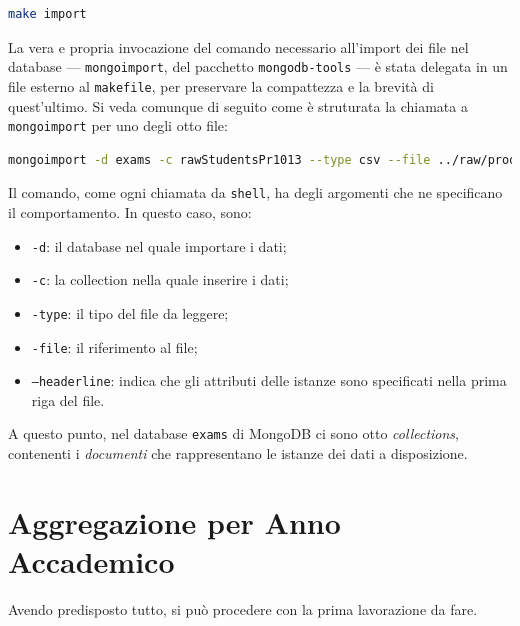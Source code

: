 	\begin{lstlisting}[language=bash,caption={importazione dei dati in MongoDB}]
		make import
	\end{lstlisting}

	\vspace{0.3cm}

	La vera e propria invocazione del comando necessario all'import dei file nel database --- \texttt{mongoimport}, del pacchetto \texttt{mongodb-tools} --- è stata delegata in un file esterno al \texttt{makefile}, per preservare la compattezza e la brevità di quest'ultimo. Si veda comunque di seguito come è struturata la chiamata a \texttt{mongoimport} per uno degli otto file: 

	\begin{lstlisting}[language=bash,caption={dettaglio dell'importazione dei dati in MongoDB}]
		mongoimport -d exams -c rawStudentsPr1013 --type csv --file ../raw/prod_stud_10-11-12-13.csv --headerline
	\end{lstlisting}

	\vspace{0.3cm}

	Il comando, come ogni chiamata da \texttt{shell}, ha degli argomenti che ne specificano il comportamento. In questo caso, sono:

	\begin{itemize}
		\item \texttt{-d}: il database nel quale importare i dati;
		\item \texttt{-c}: la collection nella quale inserire i dati;
		\item \texttt{-type}: il tipo del file da leggere;
		\item \texttt{-file}: il riferimento al file;
		\item \texttt{--headerline}: indica che gli attributi delle istanze sono specificati nella prima riga del file.
	\end{itemize}

	A questo punto, nel database \texttt{exams} di MongoDB ci sono otto \textit{collections}, contenenti i \textit{documenti} che rappresentano le istanze dei dati a disposizione.

\section{Aggregazione per Anno Accademico}

	Avendo predisposto tutto, si può procedere con la prima lavorazione da fare. \\
	
